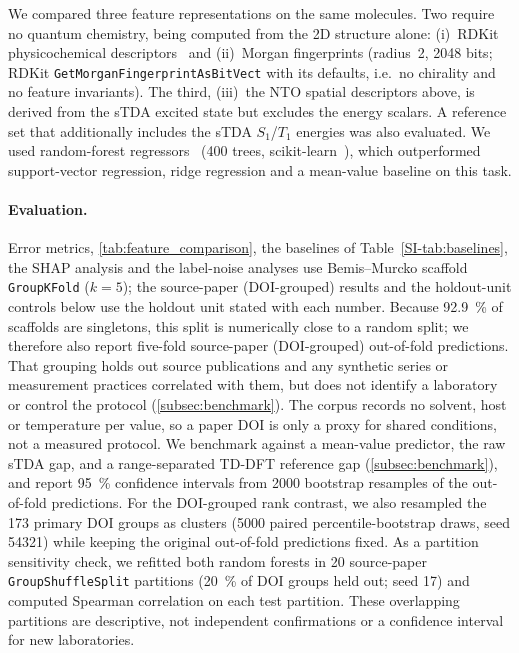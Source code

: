 We compared three feature representations on the same molecules. Two require no
quantum chemistry, being computed from the 2D structure alone:
(i)~RDKit physicochemical descriptors~\cite{Landrum2016} and (ii)~Morgan
fingerprints (radius~2, \num{2048} bits; RDKit
\texttt{GetMorganFingerprintAsBitVect} with its defaults, i.e.\ no chirality and
no feature invariants). The third, (iii)~the NTO spatial
descriptors above, is derived from the sTDA excited state but excludes the energy
scalars. A reference set that additionally includes the sTDA $S_1$/$T_1$
energies was also evaluated. We used random-forest
regressors~\cite{Breiman2001} (\num{400} trees, scikit-learn~\cite{Pedregosa2011}),
which outperformed support-vector regression, ridge regression and a mean-value
baseline on this task.

\paragraph{Evaluation.}
Error metrics, \cref{tab:feature_comparison}, the baselines of Table~\ref{SI-tab:baselines}, the SHAP analysis and the
label-noise analyses use Bemis--Murcko scaffold \texttt{GroupKFold} ($k=5$); the
source-paper (DOI-grouped) results and the holdout-unit controls below use the
holdout unit stated with each number. Because \qty{92.9}{\percent} of scaffolds are singletons, this split is
numerically close to a random split; we therefore also report five-fold source-paper
(DOI-grouped) out-of-fold predictions. That grouping holds out source publications and any synthetic
series or measurement practices correlated with them, but does not identify a
laboratory or control the protocol (\cref{subsec:benchmark}). The corpus records
no solvent, host or temperature per value, so a paper DOI is only a proxy for
shared conditions, not a measured protocol.
We benchmark against a mean-value predictor, the raw sTDA gap, and a
range-separated TD-DFT reference gap (\cref{subsec:benchmark}), and report
\qty{95}{\percent} confidence intervals from \num{2000} bootstrap resamples of the
out-of-fold predictions.
For the DOI-grouped rank contrast, we also resampled the \num{173} primary DOI
groups as clusters (\num{5000} paired percentile-bootstrap draws, seed \num{54321})
while keeping the original out-of-fold predictions fixed. As a partition
sensitivity check, we refitted both random forests in \num{20} source-paper
\texttt{GroupShuffleSplit} partitions (\qty{20}{\percent} of DOI groups held out;
seed \num{17}) and computed Spearman correlation on each test partition. These
overlapping partitions are descriptive, not independent confirmations or a
confidence interval for new laboratories.

